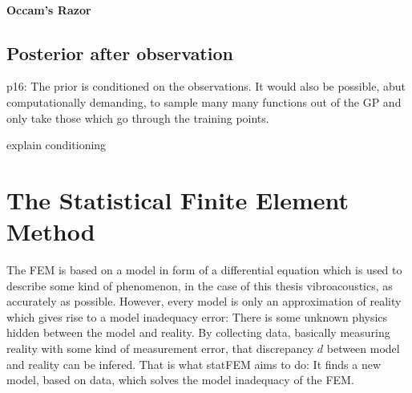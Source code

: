 \documentclass[%
  a4paper,oneside,%
  11pt,%
  smallchapters,
  green,%
  rgb, <cmyk>
  ,]{tubsbook}
\begin{document}
	
			
\paragraph{Occam's Razor}

\subsection{Posterior after observation}
p16:
The prior is conditioned on the observations. It would also be possible, abut computationally demanding, to sample many many functions out of the GP and only take those which go through the training points.

explain conditioning



\section{The Statistical Finite Element Method}
The FEM is based on a model in form of a differential equation which is used to describe some kind of phenomenon, in the case of this thesis vibroacoustics, as accurately as possible. However, every model is only an approximation of reality which gives rise to a model inadequacy error: There is some unknown physics hidden between the model and reality. By collecting data, basically measuring reality with some kind of measurement error, that discrepancy $d$ between model and reality can be infered. That is what statFEM aims to do: It finds a new model, based on data, which solves the model inadequacy of the FEM.
\end{document}
